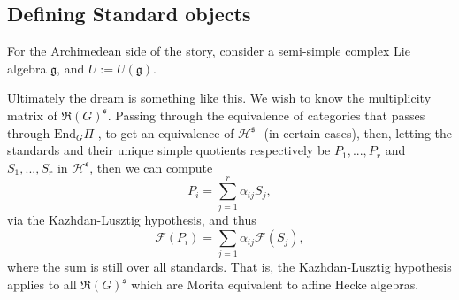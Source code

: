 \documentclass{memoir}
\newcommand{\mc}{\mathcal}
\newcommand{\mf}{\mathfrak}
\newcommand{\tx}{\text}
\theoremstyle{definition}
\begin{document}
	
	\subsection{Defining Standard objects}
	
	For the Archimedean side of the story, consider a semi-simple complex Lie algebra $\mf{g}$, and $U:=U(\mf{g})$.  
	
	
	
	
	Ultimately the dream is something like this.  
	We wish to know the multiplicity matrix of $\mf{R}(G)^{\mf{s}}$.  
	Passing through the equivalence of categories that passes through $\tx{End}_G\Pi$-\tx{Mod}, to get an equivalence of $\mc{H}^{\mf{s}}$-\tx{Mod} (in certain cases), then, letting the standards and their unique simple quotients respectively be $P_1, ..., P_r$ and $S_1, ..., S_r$ in $\mc{H}^{\mf{s}}$, then we can compute 
	$$P_i=\sum_{j=1}^r\alpha_{ij}S_j,$$
	via the Kazhdan-Lusztig hypothesis, and thus 
	$$\mc{F}(P_i)=\sum_{j=1}\alpha_{ij}\mc{F}(S_j),$$
	where the sum is still over all standards.  
	That is, the Kazhdan-Lusztig hypothesis applies to all $\mf{R}(G)^{\mf{s}}$ which are Morita equivalent to affine Hecke algebras. 
	
\end{document}
